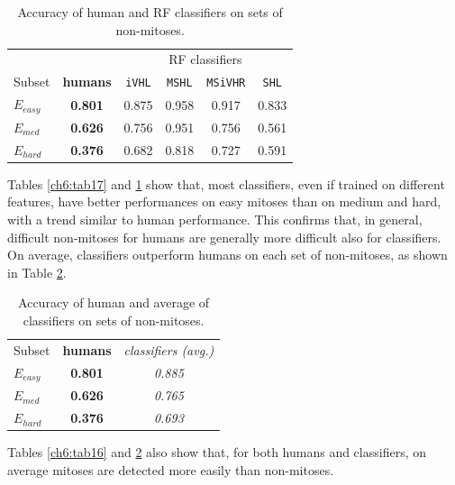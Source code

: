 \begin{table}[!hbt]
\small
 \centering
 \begin{tabular}{lccccc}
  \toprule
                  &            &  \multicolumn{4}{c}{RF classifiers}    \\
    \cmidrule(lr){3-6}
    Subset        & \textbf{humans}     & \texttt{iVHL} & \texttt{MSHL} & \texttt{MSiVHR}   & \texttt{SHL} \\
    \midrule
     $E_{easy}$   & \textbf{0.801}      & 0.875      & 0.958          & 0.917          & 0.833          \\
     $E_{med}$    & \textbf{0.626}      & 0.756      & 0.951          & 0.756          & 0.561          \\ 
     $E_{hard}$   & \textbf{0.376}      & 0.682      & 0.818          & 0.727          & 0.591          \\
     \bottomrule
 \end{tabular}
 \caption{Accuracy of human and RF classifiers on sets of non-mitoses.}
 \label{ch6:tab18}
\end{table}


Tables \ref{ch6:tab17} and \ref{ch6:tab18} show that, most classifiers, even if trained on different features, have better performances on easy mitoses than on medium and hard,
with a trend similar to human performance. This confirms that, in general, difficult non-mitoses for humans are generally more difficult also for classifiers.\\
On average, classifiers outperform humans on each set of non-mitoses, as shown in Table \ref{ch6:tab19}.


\begin{table}[!hbt]
 \small
 \centering
 \begin{tabular}{lcc}
    \toprule
    Subset        & \textbf{humans}     & \textit{classifiers (avg.)} \\
    \cmidrule(lr){1-3}
     $E_{easy}$   & \textbf{0.801}      & \textit{0.885}         \\
     $E_{med}$    & \textbf{0.626}      & \textit{0.765}         \\ 
     $E_{hard}$   & \textbf{0.376}      & \textit{0.693}         \\
     \bottomrule
 \end{tabular}
 \caption{Accuracy of human and average of classifiers on sets of non-mitoses.}
 \label{ch6:tab19}
\end{table}


Tables \ref{ch6:tab16} and \ref{ch6:tab19} also show that, for both humans and classifiers, on average mitoses are detected more easily than non-mitoses.

